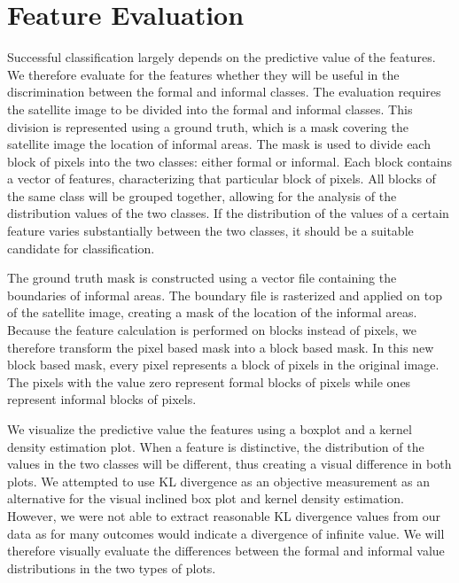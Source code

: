 
\section{Feature Evaluation}

Successful classification largely depends on the predictive value of the features. We therefore evaluate for the features whether they will be useful in the discrimination between the formal and informal classes. The evaluation requires the satellite image to be divided into the formal and informal classes. This division is represented using a ground truth, which is a mask covering the satellite image the location of informal areas. The mask is used to divide each block of pixels into the two classes: either formal or informal. Each block contains a vector of features, characterizing that particular block of pixels. All blocks of the same class will be grouped together, allowing for the analysis of the distribution values of the two classes. If the distribution of the values of a certain feature varies substantially between the two classes, it should be a suitable candidate for classification.

The ground truth mask is constructed using a vector file containing the boundaries of informal areas. The boundary file is rasterized and applied on top of the satellite image, creating a mask of the location of the informal areas. Because the feature calculation is performed on blocks instead of pixels, we therefore transform the pixel based mask into a block based mask. In this new block based mask, every pixel represents a block of pixels in the original image. The pixels with the value zero represent formal blocks of pixels while ones represent informal blocks of pixels.

We visualize the predictive value the features using a boxplot and a kernel density estimation plot. When a feature is distinctive, the distribution of the values in the two classes will be different, thus creating a visual difference in both plots. We attempted to use KL divergence as an objective measurement as an alternative for the visual inclined box plot and kernel density estimation. However, we were not able to extract reasonable KL divergence values from our data as for many outcomes would indicate a divergence of infinite value. We will therefore visually evaluate the differences between the formal and informal value distributions in the two types of plots.

